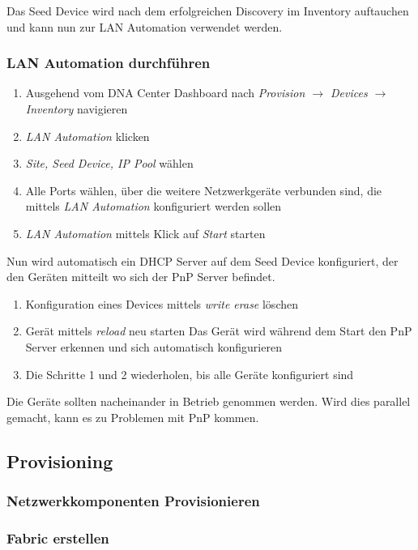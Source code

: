 Das Seed Device wird nach dem erfolgreichen Discovery im Inventory auftauchen und kann nun zur LAN Automation verwendet werden.

\subsubsection{LAN Automation durchführen}
\begin{enumerate}
	\item Ausgehend vom DNA Center Dashboard nach \textit{Provision $\rightarrow$ Devices $\rightarrow$ Inventory} navigieren
	\item \textit{LAN Automation} klicken
	\item \textit{Site, Seed Device, IP Pool} wählen
	\item Alle Ports wählen, über die weitere Netzwerkgeräte verbunden sind, die mittels \textit{LAN Automation} konfiguriert werden sollen
	\item \textit{LAN Automation} mittels Klick auf \textit{Start} starten
\end{enumerate}

Nun wird automatisch ein DHCP Server auf dem Seed Device konfiguriert, der den Geräten mitteilt wo sich der PnP Server befindet.

\begin{enumerate}
	\item Konfiguration eines Devices mittels \textit{write erase} löschen
	\item Gerät mittels \textit{reload} neu starten
	\subitem Das Gerät wird während dem Start den PnP Server erkennen und sich automatisch konfigurieren
	\item Die Schritte 1 und 2 wiederholen, bis alle Geräte konfiguriert sind
\end{enumerate}

Die Geräte sollten nacheinander in Betrieb genommen werden. Wird dies parallel gemacht, kann es zu Problemen mit PnP kommen.

\subsection{Provisioning}
\subsubsection{Netzwerkkomponenten Provisionieren}

\subsubsection{Fabric erstellen}
